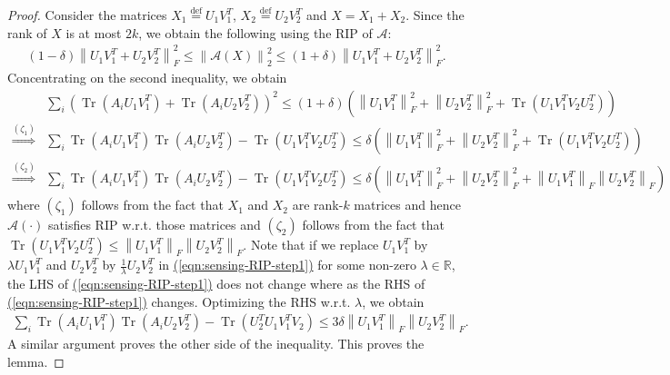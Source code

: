 \documentclass[11pt]{article}
\renewcommand{\eqref}[1]{\hyperref[#1]{(\ref*{#1})}}
\theoremstyle{plain}
\theoremstyle{definition}
\newcommand{\Tr}{\operatorname{Tr}}
\newcommand{\R}{\mathbb{R}}
\newcommand{\eqdef}{\stackrel{\textrm{def}}{=}}
\newcommand{\calA}{\mathcal{A}}
\begin{document}
\begin{proof}
  Consider the matrices $X_1\eqdef U_1V_1^T$, $X_2\eqdef U_2V_2^T$ and $X=X_1+X_2$.
Since the rank of $X$ is at most $2k$, we obtain the following using the RIP of $\calA$:
\begin{align*}
  (1-\delta) \left\|U_1V_1^T + U_2V_2^T\right\|_F^2 \leq \left\|\calA(X)\right\|_2^2
	\leq (1+\delta) \left\|U_1V_1^T+U_2V_2^T\right\|_F^2.
\end{align*}
Concentrating on the second inequality, we obtain
\begin{align}
  &\sum_i \left(\Tr\left(A_i U_1V_1^T\right)+\Tr\left(A_i U_2V_2^T\right)\right)^2
	\leq (1+\delta) \left(\left\|U_1V_1^T\right\|_F^2 + \left\|U_2V_2^T\right\|_F^2 +
		\Tr\left(U_1V_1^TV_2U_2^T\right)\right) \nonumber \\
  \stackrel{(\zeta_1)}{\Rightarrow} &\sum_i \Tr\left(A_i U_1V_1^T\right)\Tr\left(A_i U_2V_2^T\right) - \Tr\left(U_1V_1^TV_2U_2^T\right)
	\leq \delta\left(\left\|U_1V_1^T\right\|_F^2 + \left\|U_2V_2^T\right\|_F^2 +
		\Tr\left(U_1V_1^TV_2U_2^T\right)\right) \nonumber \\
  \stackrel{(\zeta_2)}{\Rightarrow} &\sum_i \Tr\left(A_i U_1V_1^T\right)\Tr\left(A_i U_2V_2^T\right) - \Tr\left(U_1V_1^TV_2U_2^T\right)
	\leq \delta\left(\left\|U_1V_1^T\right\|_F^2 + \left\|U_2V_2^T\right\|_F^2 +
		\left\|U_1V_1^T\right\|_F \left\|U_2V_2^T\right\|_F \right) \label{eqn:sensing-RIP-step1}
\end{align}
where $(\zeta_1)$ follows from the fact that $X_1$ and $X_2$ are rank-$k$ matrices and hence $\calA(\cdot)$ satisfies RIP w.r.t.
those matrices and $(\zeta_2)$ follows from the fact that $\Tr\left(U_1V_1^TV_2U_2^T\right) \leq 
\left\|U_1V_1^T\right\|_F \left\|U_2V_2^T\right\|_F$. Note that if we replace $U_1V_1^T$ by $\lambda U_1V_1^T$
and $U_2V_2^T$ by $\frac{1}{\lambda} U_2V_2^T$
in \eqref{eqn:sensing-RIP-step1} for some non-zero $\lambda \in \R$, the LHS of \eqref{eqn:sensing-RIP-step1} does not
change where as the RHS of \eqref{eqn:sensing-RIP-step1} changes. Optimizing the RHS w.r.t. $\lambda$, we obtain
\begin{align*}
  \sum_i \Tr\left(A_i U_1V_1^T\right)\Tr\left(A_i U_2V_2^T\right) - \Tr\left(U_2^TU_1V_1^TV_2\right)
	\leq 3\delta \left\|U_1V_1^T\right\|_F \left\|U_2V_2^T\right\|_F.
\end{align*}
A similar argument proves the other side of the inequality. This proves the lemma.
\end{proof}
\end{document}
